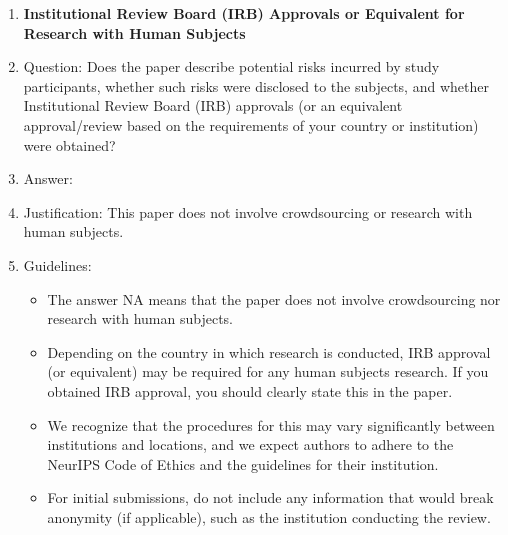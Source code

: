 \documentclass{article}
\theoremstyle{plain}
\theoremstyle{definition}
\begin{document}
\begin{enumerate}
  \item {\bf Institutional Review Board (IRB) Approvals or Equivalent for Research with Human Subjects}
  \item[] Question: Does the paper describe potential risks incurred by study participants, whether such risks were disclosed to the subjects, and whether Institutional Review Board (IRB) approvals (or an equivalent approval/review based on the requirements of your country or institution) were obtained?
  \item[] Answer: \answerNA{}
  \item[] Justification: This paper does not involve crowdsourcing or research with human subjects.
  \item[] Guidelines:
    \begin{itemize}
      \item The answer NA means that the paper does not involve crowdsourcing nor research with human subjects.
      \item Depending on the country in which research is conducted, IRB approval (or equivalent) may be required for any human subjects research. If you obtained IRB approval, you should clearly state this in the paper.
      \item We recognize that the procedures for this may vary significantly between institutions and locations, and we expect authors to adhere to the NeurIPS Code of Ethics and the guidelines for their institution.
      \item For initial submissions, do not include any information that would break anonymity (if applicable), such as the institution conducting the review.
    \end{itemize}

\end{enumerate}
\end{document}
